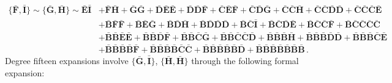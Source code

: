 \documentclass[10pt]{amsart}
\theoremstyle{definition}
\theoremstyle{corollary}
\theoremstyle{remark}
\theoremstyle{conclusion}
\begin{document}
\begin{align}
	\{\bar{\mathbf{F}}, \bar{\mathbf{I}}\} \sim \{\bar{\mathbf{G}}, \bar{\mathbf{H}}\} \sim \bar{\mathbf{E}}\bar{\mathbf{I}} &+\bar{\mathbf{F}}\bar{\mathbf{H}}+ \bar{\mathbf{G}}\bar{\mathbf{G}}+\bar{\mathbf{D}}\bar{\mathbf{E}}\bar{\mathbf{E}}+\bar{\mathbf{D}}\bar{\mathbf{D}}\bar{\mathbf{F}}+\bar{\mathbf{C}}\bar{\mathbf{E}}\bar{\mathbf{F}}+\bar{\mathbf{C}}\bar{\mathbf{D}}\bar{\mathbf{G}}+\bar{\mathbf{C}}\bar{\mathbf{C}}\bar{\mathbf{H}}+\bar{\mathbf{C}}\bar{\mathbf{C}}\bar{\mathbf{D}}\bar{\mathbf{D}}+\bar{\mathbf{C}}\bar{\mathbf{C}}\bar{\mathbf{C}}\bar{\mathbf{E}} \nonumber \\
	&+ \bar{\mathbf{B}}\bar{\mathbf{F}}\bar{\mathbf{F}}+ \bar{\mathbf{B}} \bar{\mathbf{E}} \bar{\mathbf{G}}+ \bar{\mathbf{B}} \bar{\mathbf{D}} \bar{\mathbf{H}}+ \bar{\mathbf{B}} \bar{\mathbf{D}} \bar{\mathbf{D}} \bar{\mathbf{D}}+ \bar{\mathbf{B}} \bar{\mathbf{C}} \bar{\mathbf{I}}+ \bar{\mathbf{B}} \bar{\mathbf{C}} \bar{\mathbf{D}} \bar{\mathbf{E}}+ \bar{\mathbf{B}} \bar{\mathbf{C}} \bar{\mathbf{C}} \bar{\mathbf{F}}+ \bar{\mathbf{B}} \bar{\mathbf{C}} \bar{\mathbf{C}} \bar{\mathbf{C}} \bar{\mathbf{C}}\nonumber \\
	&+  \bar{\mathbf{B}} \bar{\mathbf{B}} \bar{\mathbf{E}} \bar{\mathbf{E}}+ \bar{\mathbf{B}} \bar{\mathbf{B}} \bar{\mathbf{D}} \bar{\mathbf{F}}+ \bar{\mathbf{B}} \bar{\mathbf{B}} \bar{\mathbf{C}} \bar{\mathbf{G}}+ \bar{\mathbf{B}} \bar{\mathbf{B}} \bar{\mathbf{C}} \bar{\mathbf{C}} \bar{\mathbf{D}}+ \bar{\mathbf{B}} \bar{\mathbf{B}} \bar{\mathbf{B}} \bar{\mathbf{H}}+ \bar{\mathbf{B}} \bar{\mathbf{B}} \bar{\mathbf{B}} \bar{\mathbf{D}} \bar{\mathbf{D}}+ \bar{\mathbf{B}} \bar{\mathbf{B}} \bar{\mathbf{B}} \bar{\mathbf{C}} \bar{\mathbf{E}}\nonumber \\
	&+   \bar{\mathbf{B}} \bar{\mathbf{B}} \bar{\mathbf{B}} \bar{\mathbf{B}} \bar{\mathbf{F}} +\bar{\mathbf{B}} \bar{\mathbf{B}} \bar{\mathbf{B}} \bar{\mathbf{B}} \bar{\mathbf{C}}\bar{\mathbf{C}}  +\bar{\mathbf{B}} \bar{\mathbf{B}} \bar{\mathbf{B}} \bar{\mathbf{B}} \bar{\mathbf{B}} \bar{\mathbf{D}} +\bar{\mathbf{B}} \bar{\mathbf{B}} \bar{\mathbf{B}} \bar{\mathbf{B}} \bar{\mathbf{B}} \bar{\mathbf{B}} \bar{\mathbf{B}} \, .
\end{align}
Degree fifteen expansions involve $\{\bar{\mathbf{G}},\bar{\mathbf{I}} \}$,  $\{\bar{\mathbf{H}},\bar{\mathbf{H}} \}$  through the following formal expansion:
\end{document}
